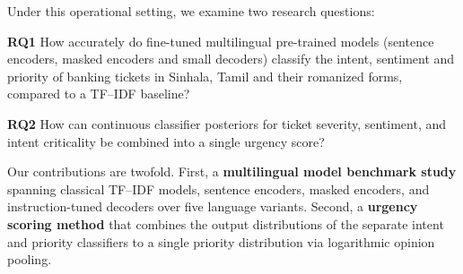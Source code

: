 Under this operational setting, we examine two research questions:

\textbf{RQ1} How accurately do fine-tuned multilingual pre-trained models (sentence encoders, masked encoders and small decoders) classify the intent, sentiment and priority of banking tickets in Sinhala, Tamil and their romanized forms, compared to a TF–IDF baseline? 

\textbf{RQ2} How can continuous classifier posteriors for ticket severity, sentiment, and intent criticality be combined into a single urgency score? 

Our contributions are twofold. First, a \textbf{multilingual model benchmark study} spanning classical TF--IDF models, sentence encoders, masked encoders, and instruction-tuned decoders over five language variants. Second, a \textbf{urgency scoring method} that combines the output distributions of the separate intent and priority classifiers to a single priority distribution via logarithmic opinion pooling.
